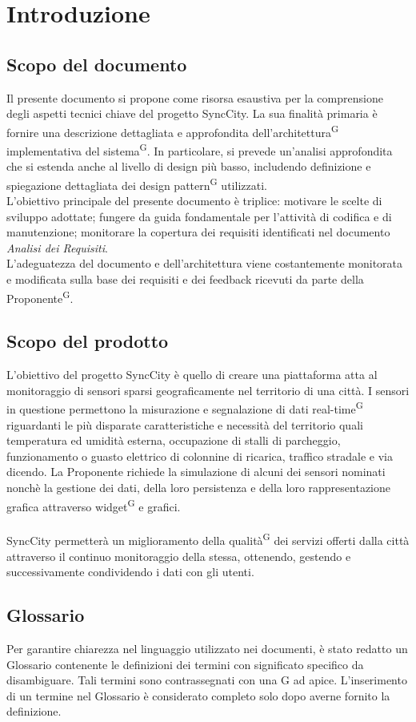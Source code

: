 \documentclass[8pt]{article}
\newcommand{\glossterm}[1]{#1\textsuperscript{G}} %
\begin{document}
\section{Introduzione}\label{sec:intro}
\subsection{Scopo del documento}
Il presente documento si propone come risorsa esaustiva per la comprensione degli aspetti
tecnici chiave del progetto SyncCity. La sua finalità primaria è fornire una descrizione
dettagliata e approfondita dell’\glossterm{architettura} implementativa del \glossterm{sistema}. 
In particolare, si prevede un’analisi approfondita che si estenda anche al livello di design più
basso, includendo definizione e spiegazione dettagliata dei \glossterm{design pattern} utilizzati.\\
L’obiettivo principale del presente documento è triplice:
motivare le scelte di sviluppo adottate; fungere da guida fondamentale per l’attività di codifica e di manutenzione; monitorare la copertura dei requisiti identificati nel
documento \textit{Analisi dei Requisiti}. \\
L’adeguatezza del documento e dell’architettura viene costantemente monitorata e modificata sulla base dei
requisiti e dei feedback ricevuti da parte della \glossterm{Proponente}.
\subsection{Scopo del prodotto}
L'obiettivo del progetto SyncCity è quello di creare una piattaforma atta al monitoraggio
di sensori sparsi geograficamente nel territorio di una città. I sensori in questione
permettono la misurazione e segnalazione di dati \glossterm{real-time} riguardanti le più disparate
caratteristiche e necessità del territorio quali temperatura ed umidità esterna, occupazione di
stalli di parcheggio, funzionamento o guasto elettrico di colonnine di ricarica, traffico stradale e via
dicendo. La Proponente richiede la simulazione di alcuni dei sensori nominati nonchè la
gestione dei dati, della loro persistenza e della loro rappresentazione grafica attraverso \glossterm{widget} e
grafici. 
\\\\SyncCity permetterà un miglioramento della \glossterm{qualità} dei servizi offerti dalla città attraverso il continuo monitoraggio della stessa, ottenendo, gestendo e successivamente condividendo i dati con gli utenti. 
\subsection{Glossario}
Per garantire chiarezza nel linguaggio utilizzato nei documenti, è stato redatto un Glossario contenente le definizioni dei termini con significato specifico da disambiguare. Tali termini sono contrassegnati con una G ad apice. L'inserimento di un termine nel Glossario è considerato completo solo dopo averne fornito la definizione.
\end{document}
